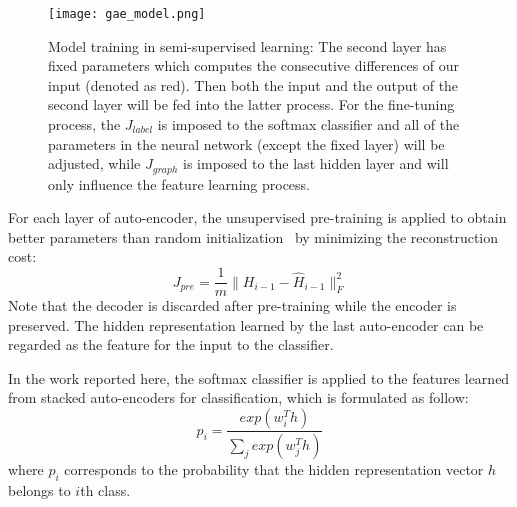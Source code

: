 \documentclass[letterpaper, 10 pt, conference]{ieeeconf}  %
\begin{document}
\begin{figure}[tpb]
\centering
\texttt{[image: gae\_model.png]}
\caption{Model training in semi-supervised learning: The second layer has fixed parameters which computes the consecutive differences of our input (denoted as red). Then both the input and the output of the second layer will be fed into the latter process. For the fine-tuning process, the $J_{label}$ is imposed to the softmax classifier and all of the parameters in the neural network (except the fixed layer) will be adjusted, while $J_{graph}$ is imposed to the last hidden layer and will only influence the feature learning process. }
\label{model}
\end{figure}

For each layer of auto-encoder, the unsupervised pre-training is applied to obtain better parameters than random initialization~\cite{HinSal06} by minimizing the reconstruction cost:
\begin{equation}\label{jcostm}
    J_{pre} = \frac{1}{m}\|H_{i-1}-\hat{H}_{i-1}\|_F^2
\end{equation}
Note that the decoder is discarded after pre-training while the encoder is preserved. The hidden representation learned by the last auto-encoder can be regarded as the feature for the input to the classifier.

In the work reported here, the softmax classifier is applied to the features learned from stacked auto-encoders for classification, which is formulated as follow:
\begin{equation}\label{softmax}
p_i = \frac{exp(w_i^Th)}{\sum_{j}{exp(w_j^Th)}}
\end{equation} 
where $p_i$ corresponds to the probability that the hidden representation vector $h$ belongs to $i$th class.
\end{document}
